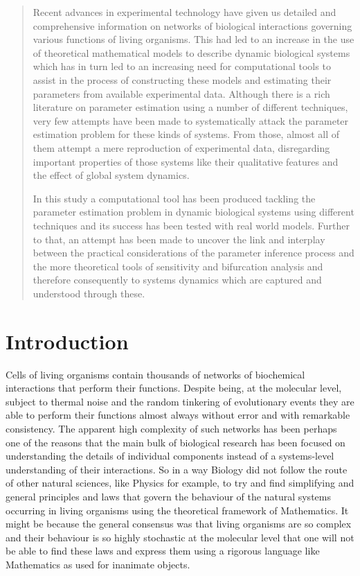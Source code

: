 \documentclass[12pt,a4paper,titlepage]{article}
\begin{document}

\begin{abstract}
Recent advances in experimental technology have given us detailed and comprehensive information on networks of biological interactions governing various functions of living organisms. This had led to an increase in the use of theoretical mathematical models to describe dynamic biological systems which has in turn led to an increasing need for computational tools to assist in the process of constructing these models and estimating their parameters from available experimental data. Although there is a rich literature on parameter estimation using a number of different techniques, very few attempts have been made to systematically attack the parameter estimation problem for these kinds of systems. From those, almost all of them attempt a mere reproduction of experimental data, disregarding important properties of those systems like their qualitative features and the effect of global system dynamics. 

In this study a computational tool has been produced tackling the parameter estimation problem in dynamic biological systems using different techniques and its success has been tested with real world models. Further to that, an attempt has been made to uncover the link and interplay between the practical considerations of the parameter inference process and the more theoretical tools of sensitivity and bifurcation analysis and therefore consequently to systems dynamics which are captured and understood through these. 
\end{abstract}
\tableofcontents
\newpage
\section{Introduction}
Cells of living organisms contain thousands of networks of biochemical interactions that perform their functions. Despite being, at the molecular level, subject to thermal noise and the random tinkering of evolutionary events they are able to perform their functions almost always without error and with remarkable consistency. The apparent high complexity of such networks has been perhaps one of the reasons that the main bulk of biological research has been focused on understanding the details of individual components instead of a systems-level understanding of their interactions. So in a way Biology did not follow the route of other natural sciences, like Physics for example, to try and find simplifying and general principles and laws that govern the behaviour of the natural systems occurring in living organisms using the theoretical framework of Mathematics. It might be because the general consensus was that living organisms are so complex and their behaviour is so highly stochastic at the molecular level that one will not be able to find these laws and express them using a rigorous language like Mathematics as used for inanimate objects. 
\end{document}
